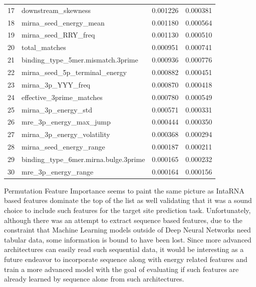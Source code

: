 \documentclass[en,ack]{dimscthesis}
\begin{document}
\begin{table}[H]
\begin{tabular}{llrr}
        17 & downstream\_skewness & 0.001226 & 0.000381 \\
        18 & mirna\_seed\_energy\_mean & 0.001180 & 0.000564 \\
        19 & mirna\_seed\_RRY\_freq & 0.001130 & 0.000510 \\
        20 & total\_matches & 0.000951 & 0.000741 \\
        21 & binding\_type\_5mer.mismatch.3prime & 0.000936 & 0.000776 \\
        22 & mirna\_seed\_5p\_terminal\_energy & 0.000882 & 0.000451 \\
        23 & mirna\_3p\_YYY\_freq & 0.000870 & 0.000418 \\
        24 & effective\_3prime\_matches & 0.000780 & 0.000549 \\
        25 & mirna\_3p\_energy\_std & 0.000571 & 0.000331 \\
        26 & mre\_3p\_energy\_max\_jump & 0.000444 & 0.000350 \\
        27 & mirna\_3p\_energy\_volatility & 0.000368 & 0.000294 \\
        28 & mirna\_seed\_energy\_range & 0.000187 & 0.000211 \\
        29 & binding\_type\_6mer.mirna.bulge.3prime & 0.000165 & 0.000232 \\
        30 & mre\_3p\_energy\_range & 0.000164 & 0.000156 \\
        \bottomrule
    \end{tabular}
\end{table}

\par Permutation Feature Importance seems to paint the same picture as IntaRNA based features dominate the top of the list as well validating that it was a sound choice to include such features for the target site prediction task. Unfortunately, although there was an attempt to extract sequence based features, due to the constraint that Machine Learning models outside of Deep Neural Networks need tabular data, some information is bound to have been lost. Since more advanced architectures can easily read such sequential data, it would be interesting as a future endeavor to incorporate sequence along with energy related features and train a more advanced model with the goal of evaluating if such features are already learned by sequence alone from such architectures.
\end{document}
